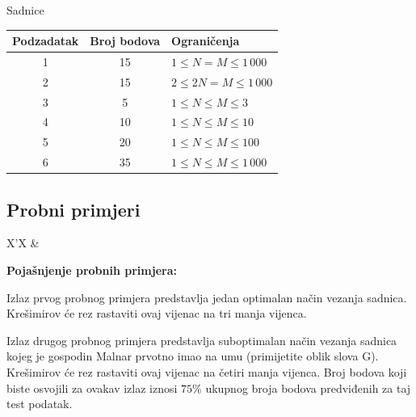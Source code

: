 \begin{statement}[
  problempoints=100,
  timelimit=3 sekunde,
  memorylimit=512 MiB,
]{Sadnice}
{\renewcommand{\arraystretch}{1.4}
  \setlength{\tabcolsep}{6pt}
  \begin{tabular}{ccl}
 Podzadatak & Broj bodova & Ograničenja \\ \midrule
  1 & 15 & $1 \le N = M \le 1\,000$ \\
  2 & 15 & $2 \le 2N = M \le 1\,000$ \\
  3 & 5 & $1 \le N \le M \le 3$ \\
  4 & 10 & $1 \le N \le M \le 10$ \\
  5 & 20 & $1 \le N \le M \le 100$ \\
  6 & 35 & $1 \le N \le M \le 1\,000$ \\
\end{tabular}}

\subsection*{Probni primjeri}
\begin{tabularx}{\textwidth}{X'X}
 &
\end{tabularx}

\textbf{Pojašnjenje probnih primjera:}

Izlaz prvog probnog primjera predstavlja jedan optimalan način vezanja
sadnica. Krešimirov će rez rastaviti ovaj vijenac na tri manja vijenca.

Izlaz drugog probnog primjera predstavlja suboptimalan način vezanja
sadnica kojeg je gospodin Malnar prvotno imao na umu (primijetite oblik
slova G). Krešimirov će rez rastaviti ovaj vijenac na četiri manja vijenca.
Broj bodova koji biste osvojili za ovakav izlaz iznosi $75\%$ ukupnog
broja bodova predviđenih za taj test podatak.

\end{statement}

